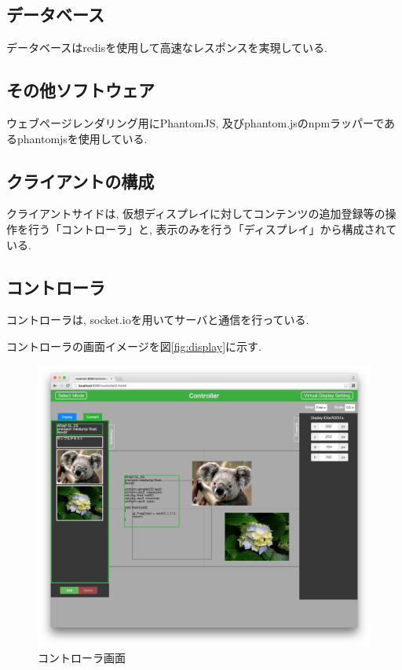\documentclass[a4paper,10pt,oneside]{jsbook}
\begin{document}
\subsection{データベース}
データベースはredisを使用して高速なレスポンスを実現している. 

\subsection{その他ソフトウェア}
ウェブページレンダリング用にPhantomJS, 及びphantom.jsのnpmラッパーであるphantomjsを使用している.

\subsection{クライアントの構成}
クライアントサイドは, 仮想ディスプレイに対してコンテンツの追加登録等の操作を行う「コントローラ」と, 表示のみを行う「ディスプレイ」から構成されている.

\subsection{コントローラ}
コントローラは, socket.ioを用いてサーバと通信を行っている. 

コントローラの画面イメージを図\ref{fig:display}に示す.

\begin{figure}[htbp]
	\begin{center}
		\includegraphics[width=14.5cm]{image/controller.png}
	\end{center}
	\caption{コントローラ画面}
	\label{fig:controller}
\end{figure}
\end{document}
